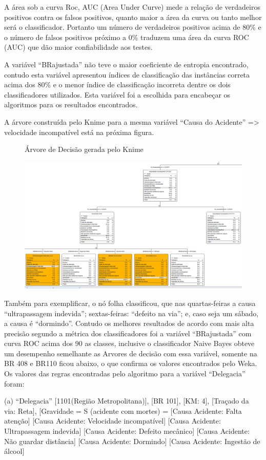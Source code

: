 A área sob a curva Roc, AUC (Area Under Curve) mede a
relação de verdadeiros positivos contra os falsos positivos,
quanto maior a área da curva ou tanto melhor será o
classificador. Portanto um número de verdadeiros positivos
acima de 80\% e o número de falsos positivos próximo a 0\%
traduzem uma área da curva ROC (AUC) que dão maior confiabilidade
aos testes.

A variável “BRajustada” não teve o maior coeficiente de
entropia encontrado, contudo esta variável apresentou
índices de classificação das instâncias correta acima dos 80\% e
o menor índice de classificação incorreta dentre os dois
classificadores utilizados. Esta variável foi a escolhida para
encabeçar os algoritmos para os resultados encontrados. 

A árvore construída pelo Knime para a mesma variável “Causa do Acidente” => velocidade incompatível está na
próxima figura.
\begin{figure}
\centering
\caption{Árvore de Decisão gerada pelo Knime}
\includegraphics[width=0.7\linewidth]{Figuras/Metodologia/arvoreKnime.png}
\caption{}
\label{fig:arvoreKnime}
\end{figure}


\pagebreak

Também para exemplificar, o nó folha classificou, que nas
quartas-feiras a causa “ultrapassagem indevida”; sextas-feiras:
“defeito na via”; e, caso seja um sábado, a causa é “dormindo”.
Contudo os melhores resultados de acordo com mais alta
precisão segundo a métrica dos classificadores foi a variável
“BRajustada” com curva ROC acima dos 90%
as classes, inclusive o classificador Naive Bayes obteve um
desempenho semelhante as Arvores de decisão com essa
variável, somente na BR 408 e BR110 ficou abaixo, o que
confirma os valores encontrados pelo Weka.
Os valores das regras encontradas pelo algoritmo para a
variável “Delegacia” foram:

(a) “Delegacia” [1101(Região Metropolitana)], [BR 101],
[KM: 4], [Traçado da via: Reta], [Gravidade = S (acidente com
mortes) = 
[Causa Acidente: Falta atenção]
[Causa Acidente: Velocidade incompatível]
[Causa Acidente: Ultrapassagem indevida]
[Causa Acidente: Defeito mecânico]
[Causa Acidente: Não guardar distância]
[Causa Acidente: Dormindo]
[Causa Acidente: Ingestão de álcool]

